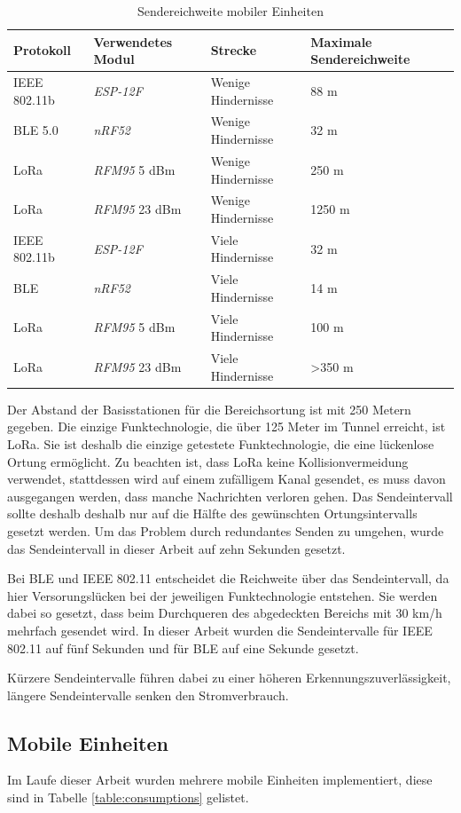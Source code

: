 \begin{table}[h]
	\centering
	\caption{Sendereichweite mobiler Einheiten}
	\label{table:ranges}
	\begin{tabular}{l|l|l|R{3cm}}
		Protokoll & Verwendetes Modul & Strecke & Maximale Sendereichweite \\
		\hline
		IEEE 802.11b & \emph{ESP-12F} & Wenige Hindernisse & 88 m \\
		BLE 5.0 & \emph{nRF52} & Wenige Hindernisse & 32 m \\
		LoRa & \emph{RFM95} 5 dBm & Wenige Hindernisse & 250 m \\
		LoRa & \emph{RFM95} 23 dBm & Wenige Hindernisse & 1250 m \\
		\hline
		IEEE 802.11b & \emph{ESP-12F}  & Viele Hindernisse & 32 m \\
		BLE & \emph{nRF52}  & Viele Hindernisse & 14 m \\
		LoRa & \emph{RFM95} 5 dBm & Viele Hindernisse & 100 m \\
		LoRa & \emph{RFM95} 23 dBm & Viele Hindernisse & >350 m \\
	\end{tabular}
\end{table}

Der Abstand der Basisstationen für die Bereichsortung ist mit 250 Metern gegeben. 
Die einzige Funktechnologie, die über 125 Meter im Tunnel erreicht, ist LoRa.
Sie ist deshalb die einzige getestete Funktechnologie, die eine lückenlose Ortung ermöglicht.
Zu beachten ist, dass LoRa keine Kollisionvermeidung verwendet, stattdessen wird auf einem zufälligem Kanal gesendet, es muss davon ausgegangen werden, dass manche Nachrichten verloren gehen.
Das Sendeintervall sollte deshalb deshalb nur auf die Hälfte des gewünschten Ortungsintervalls gesetzt werden. 
Um das Problem durch redundantes Senden zu umgehen, wurde das Sendeintervall in dieser Arbeit auf zehn Sekunden gesetzt.

Bei BLE und IEEE 802.11 entscheidet die Reichweite über das Sendeintervall, da hier Versorungslücken bei der jeweiligen Funktechnologie entstehen.
Sie werden dabei so gesetzt, dass beim Durchqueren des abgedeckten Bereichs mit 30 km/h mehrfach gesendet wird.
In dieser Arbeit wurden die Sendeintervalle für IEEE 802.11 auf fünf Sekunden und für BLE auf eine Sekunde gesetzt.

Kürzere Sendeintervalle führen dabei zu einer höheren Erkennungszuverlässigkeit, längere Sendeintervalle senken den Stromverbrauch.

\subsection{Mobile Einheiten}
Im Laufe dieser Arbeit wurden mehrere mobile Einheiten implementiert, diese sind in Tabelle \ref{table:consumptions} gelistet.

